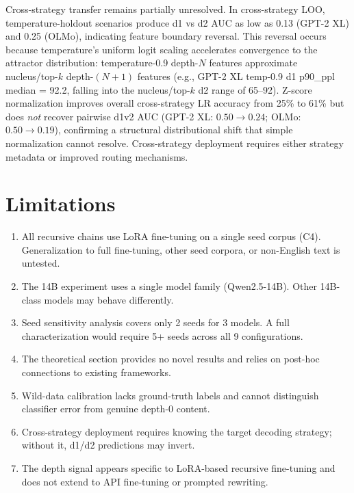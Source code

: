 \documentclass[11pt,a4paper]{article}
\begin{document}
Cross-strategy transfer remains partially unresolved. In cross-strategy LOO, temperature-holdout scenarios produce d1 vs d2 AUC as low as 0.13 (GPT-2 XL) and 0.25 (OLMo), indicating feature boundary reversal. This reversal occurs because temperature's uniform logit scaling accelerates convergence to the attractor distribution: temperature-0.9 depth-$N$ features approximate nucleus/top-$k$ depth-$(N{+}1)$ features (e.g., GPT-2 XL temp-0.9 d1 p90\_ppl median = 92.2, falling into the nucleus/top-$k$ d2 range of 65--92). Z-score normalization improves overall cross-strategy LR accuracy from 25\% to 61\% but does \emph{not} recover pairwise d1v2 AUC (GPT-2 XL: $0.50 \to 0.24$; OLMo: $0.50 \to 0.19$), confirming a structural distributional shift that simple normalization cannot resolve. Cross-strategy deployment requires either strategy metadata or improved routing mechanisms.

\section{Limitations}

\begin{enumerate}[nosep]
    \item All recursive chains use LoRA fine-tuning on a single seed corpus (C4). Generalization to full fine-tuning, other seed corpora, or non-English text is untested.
    \item The 14B experiment uses a single model family (Qwen2.5-14B). Other 14B-class models may behave differently.
    \item Seed sensitivity analysis covers only 2 seeds for 3 models. A full characterization would require 5+ seeds across all 9 configurations.
    \item The theoretical section provides no novel results and relies on post-hoc connections to existing frameworks.
    \item Wild-data calibration lacks ground-truth labels and cannot distinguish classifier error from genuine depth-0 content.
    \item Cross-strategy deployment requires knowing the target decoding strategy; without it, d1/d2 predictions may invert.
    \item The depth signal appears specific to LoRA-based recursive fine-tuning and does not extend to API fine-tuning or prompted rewriting.
\end{enumerate}
\end{document}
